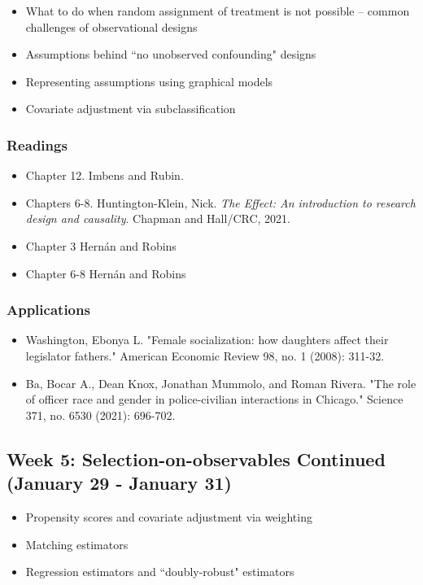 \documentclass[11pt, article, oneside]{memoir}
\theoremstyle{Assumption}
\begin{document}
\begin{itemize}
\item What to do when random assignment of treatment is not possible -- common challenges of observational designs
\item Assumptions behind ``no unobserved confounding" designs
\item Representing assumptions using graphical models
\item Covariate adjustment via subclassification
\end{itemize}

\subsubsection*{Readings}

\begin{itemize}
\item Chapter 12. Imbens and Rubin.
\item Chapters 6-8. Huntington-Klein, Nick. \emph{The Effect: An introduction to research design and causality}. Chapman and Hall/CRC, 2021.
\item Chapter 3 Hern\'an and  Robins
\item Chapter 6-8 Hern\'an and  Robins
\end{itemize}

\subsubsection*{Applications}

\begin{itemize}
\item Washington, Ebonya L. "Female socialization: how daughters affect their legislator fathers." American Economic Review 98, no. 1 (2008): 311-32.
\item Ba, Bocar A., Dean Knox, Jonathan Mummolo, and Roman Rivera. "The role of officer race and gender in police-civilian interactions in Chicago." Science 371, no. 6530 (2021): 696-702.
\end{itemize}

\subsection{Week 5: Selection-on-observables Continued (January 29 - January 31)}

\begin{itemize}
\item Propensity scores and covariate adjustment via weighting 
\item Matching estimators
\item Regression estimators and ``doubly-robust" estimators
\end{itemize}
\end{document}
